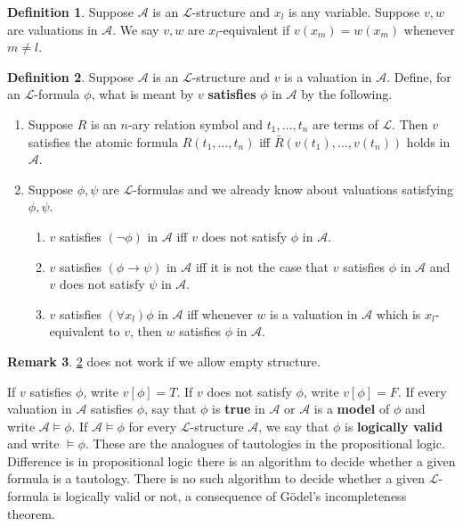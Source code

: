 \documentclass{article}
\newcommand{\rb}[1]{\left( #1 \right)}
\renewcommand{\sb}[1]{\left[ #1 \right]}
\newcommand{\notb}[1]{\rb{\neg #1}}
\newcommand{\impb}[2]{\rb{#1 \rightarrow #2}}
\newcommand{\fab}[1]{\rb{\forall #1}}
\theoremstyle{definition}\newtheorem{definition}{Definition}[subsection]
\theoremstyle{definition}\newtheorem{remark}[definition]{Remark}
\theoremstyle{definition}\newtheorem*{example}{Example}
\theoremstyle{definition}\newtheorem*{note}{Note}
\begin{document}
\begin{definition}
Suppose $ \mathcal{A} $ is an $ \mathcal{L} $-structure and $ x_l $ is any variable. Suppose $ v, w $ are valuations in $ \mathcal{A} $. We say $ v, w $ are $ x_l $-equivalent if $ v\rb{x_m} = w\rb{x_m} $ whenever $ m \ne l $.
\end{definition}

\begin{definition}
\label{def:2.2.9}
Suppose $ \mathcal{A} $ is an $ \mathcal{L} $-structure and $ v $ is a valuation in $ \mathcal{A} $. Define, for an $ \mathcal{L} $-formula $ \phi $, what is meant by $ v $ \textbf{satisfies} $ \phi $ in $ \mathcal{A} $ by the following.
\begin{enumerate}
\item Suppose $ R $ is an $ n $-ary relation symbol and $ t_1, \dots, t_n $ are terms of $ \mathcal{L} $. Then $ v $ satisfies the atomic formula $ R\rb{t_1, \dots, t_n} $ iff $ \bar{R}\rb{v\rb{t_1}, \dots, v\rb{t_n}} $ holds in $ \mathcal{A} $.
\item Suppose $ \phi, \psi $ are $ \mathcal{L} $-formulas and we already know about valuations satisfying $ \phi, \psi $.
\begin{enumerate}
\item $ v $ satisfies $ \notb{\phi} $ in $ \mathcal{A} $ iff $ v $ does not satisfy $ \phi $ in $ \mathcal{A} $.
\item $ v $ satisfies $ \impb{\phi}{\psi} $ in $ \mathcal{A} $ iff it is not the case that $ v $ satisfies $ \phi $ in $ \mathcal{A} $ and $ v $ does not satisfy $ \psi $ in $ \mathcal{A} $.
\item $ v $ satisfies $ \fab{x_l}\phi $ in $ \mathcal{A} $ iff whenever $ w $ is a valuation in $ \mathcal{A} $ which is $ x_l $-equivalent to $ v $, then $ w $ satisfies $ \phi $ in $ \mathcal{A} $.
\end{enumerate}
\end{enumerate}
\end{definition}


\begin{remark}
\ref{def:2.2.9} does not work if we allow empty structure.
\end{remark}

If $ v $ satisfies $ \phi $, write $ v\sb{\phi} = T $. If $ v $ does not satisfy $ \phi $, write $ v\sb{\phi} = F $. If every valuation in $ \mathcal{A} $ satisfies $ \phi $, say that $ \phi $ is \textbf{true} in $ \mathcal{A} $ or $ \mathcal{A} $ is a \textbf{model} of $ \phi $ and write $ \mathcal{A} \vDash \phi $. If $ \mathcal{A} \vDash \phi $ for every $ \mathcal{L} $-structure $ \mathcal{A} $, we say that $ \phi $ is \textbf{logically valid} and write $ \vDash \phi $. These are the analogues of tautologies in the propositional logic. Difference is in propositional logic there is an algorithm to decide whether a given formula is a tautology. There is no such algorithm to decide whether a given $ \mathcal{L} $-formula is logically valid or not, a consequence of Gödel's incompleteness theorem.
\end{document}
